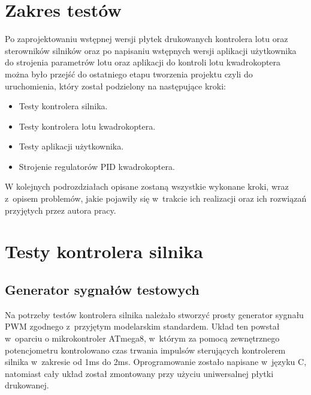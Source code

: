 \documentclass[11pt, twoside]{Thesis} %
\begin{document}
\label{Chapter7} %


\section{Zakres testów}

Po zaprojektowaniu wstępnej wersji płytek drukowanych kontrolera lotu oraz sterowników silników oraz po napisaniu wstępnych wersji aplikacji użytkownika do strojenia parametrów lotu oraz aplikacji do kontroli lotu kwadrokoptera można było przejść do ostatniego etapu tworzenia projektu czyli do uruchomienia, który został podzielony na następujące kroki:

\begin{itemize}
	\item Testy kontrolera silnika.
	\item Testy kontrolera lotu kwadrokoptera.
	\item Testy aplikacji użytkownika.
	\item Strojenie regulatorów PID kwadrokoptera.
\end{itemize} 

W kolejnych podrozdziałach opisane zostaną wszystkie wykonane kroki, wraz z~opisem problemów, jakie pojawiły się w~trakcie ich realizacji oraz ich rozwiązań przyjętych przez autora pracy.

\section{Testy kontrolera silnika}

\subsection{Generator sygnałów testowych}

Na potrzeby testów kontrolera silnika należało stworzyć prosty generator sygnału PWM zgodnego z~przyjętym modelarskim standardem. Układ ten powstał w~oparciu o mikrokontroler ATmega8, w~którym za pomocą zewnętrznego potencjometru kontrolowano czas trwania impulsów sterujących kontrolerem silnika w~zakresie od 1ms do 2ms. Oprogramowanie zostało napisane w~języku C, natomiast cały układ został zmontowany przy użyciu uniwersalnej płytki drukowanej.
\end{document}
